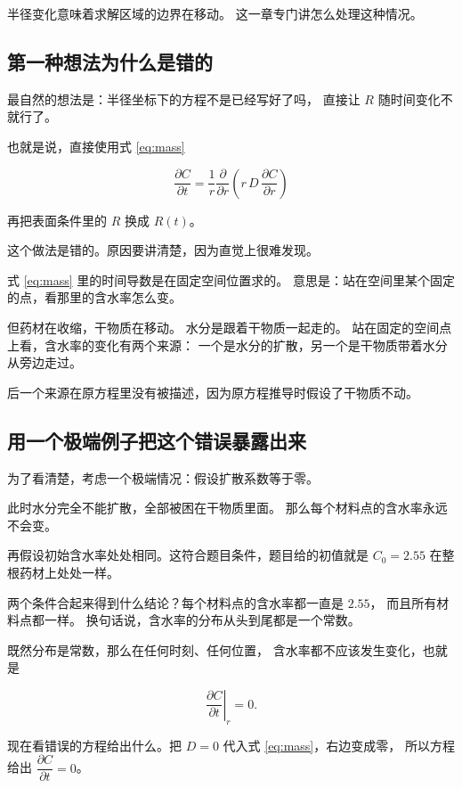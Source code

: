 半径变化意味着求解区域的边界在移动。
这一章专门讲怎么处理这种情况。

\subsection{第一种想法为什么是错的}

最自然的想法是：半径坐标下的方程不是已经写好了吗，
直接让 $R$ 随时间变化不就行了。

也就是说，直接使用式 \eqref{eq:mass}

\begin{equation}
\frac{\partial C}{\partial t}
= \frac{1}{r}\frac{\partial}{\partial r}\left(r\,D\,\frac{\partial C}{\partial r}\right)
\end{equation}

再把表面条件里的 $R$ 换成 $R(t)$。

这个做法是错的。原因要讲清楚，因为直觉上很难发现。

式 \eqref{eq:mass} 里的时间导数是在固定空间位置求的。
意思是：站在空间里某个固定的点，看那里的含水率怎么变。

但药材在收缩，干物质在移动。
水分是跟着干物质一起走的。
站在固定的空间点上看，含水率的变化有两个来源：
一个是水分的扩散，另一个是干物质带着水分从旁边走过。

后一个来源在原方程里没有被描述，因为原方程推导时假设了干物质不动。

\subsection{用一个极端例子把这个错误暴露出来}

为了看清楚，考虑一个极端情况：假设扩散系数等于零。

此时水分完全不能扩散，全部被困在干物质里面。
那么每个材料点的含水率永远不会变。

再假设初始含水率处处相同。这符合题目条件，题目给的初值就是
$C_0=2.55$ 在整根药材上处处一样。

两个条件合起来得到什么结论？每个材料点的含水率都一直是 $2.55$，
而且所有材料点都一样。
换句话说，含水率的分布从头到尾都是一个常数。

既然分布是常数，那么在任何时刻、任何位置，
含水率都不应该发生变化，也就是

\begin{equation}
\left.\frac{\partial C}{\partial t}\right|_r = 0 .
\end{equation}

现在看错误的方程给出什么。把 $D=0$ 代入式 \eqref{eq:mass}，右边变成零，
所以方程给出 $\dfrac{\partial C}{\partial t}=0$。

